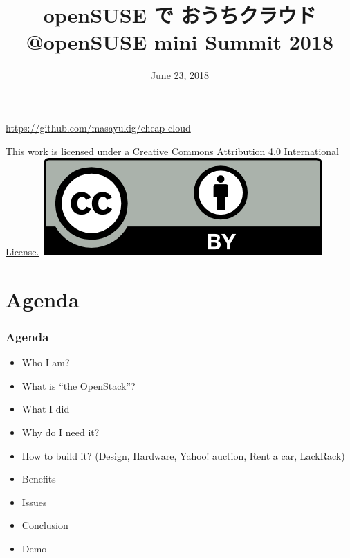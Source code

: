 \documentclass[aspectratio=169,11pt,hyperref={colorlinks=true}]{beamer}
\author[Masayuki Igawa]{%
    \texorpdfstring{%
        \begin{columns}
        \column{.45\linewidth}
            \centering
            Masayuki Igawa\\
            \href{mailto:masayuki@igawa.io}{masayuki@igawa.io}\\
            \texttt{masayukig on Freenode, GitHub, Twitter}
        \end{columns}
        }
    {Masayuki Igawa}
}
\date{June 23, 2018}
\title[private-cloud-on-openSUSE
  \hspace{2em}\insertframenumber/\inserttotalframenumber]{openSUSE で おうちクラウド
  \\ @openSUSE mini Summit 2018}
\begin{document}
{%
\begin{frame}[noframenumbering]
  \hypersetup{colorlinks,urlcolor=suse}
  \titlepage{}
  \centering
  \@place \par
  \href{https://github.com/masayukig/cheap-cloud}{https://github.com/masayukig/cheap-cloud}
  \vspace{1em}
  \begin{flushright}
    \tiny\href{https://creativecommons.org/licenses/by/4.0/}{This work
      is licensed under a Creative Commons Attribution 4.0
      International License.}~\includegraphics[scale=0.3]{cc_by.png}
  \end{flushright}
\end{frame}
}

\section{Agenda}
\begin{frame}
  \frametitle{Agenda}
  \begin{itemize}
    \item Who I am?
    \item What is ``the OpenStack''?
    \item What I did
    \item Why do I need it?
    \item How to build it? (Design, Hardware, Yahoo! auction, Rent a
      car, LackRack)
    \item Benefits
    \item Issues
    \item Conclusion
    \item Demo
  \end{itemize}
\end{frame}
\end{document}
